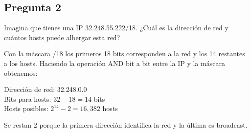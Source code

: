 \subsection{Pregunta 2}

Imagina que tienes una IP 32.248.55.222/18. ¿Cuál es la dirección de red y cuántos hosts puede albergar esta red?

\begin{respuesta}
Con la máscara /18 los primeros 18 bits corresponden a la red y los 14 restantes a los hosts. Haciendo la operación AND bit a bit entre la IP y la máscara obtenemos:

Dirección de red: 32.248.0.0 \\
Bits para hosts: $32 - 18 = 14$ bits \\
Hosts posibles: $2^{14} - 2 = 16{,}382$ hosts

Se restan 2 porque la primera dirección identifica la red y la última es broadcast.

    
\end{respuesta}
